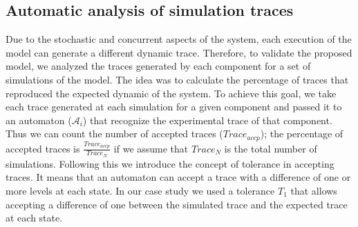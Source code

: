  
 \subsection{Automatic analysis of simulation traces}
 
 Due to the stochastic and concurrent aspects of the system, each execution of the model can generate a different dynamic trace.
 Therefore, to validate the proposed model, we analyzed the traces generated by each component for a set of simulations of the model.
 The idea was to calculate the percentage of traces that reproduced the expected dynamic of the system. 
To achieve this goal, we take each trace generated
 at each simulation for a given component and passed it to an automaton ($\mathcal{A}_{i}$) that recognize the 
experimental trace of that component. Thus we can count the 
 number of accepted traces ($Trace_{accp}$);
the percentage of accepted traces is $\frac{Trace_{accp}}{Trace_{N}}$ if we assume that $Trace_{N}$ is the total 
 number of simulations. 
 Following this we introduce the concept of tolerance in accepting traces. It means that an automaton can accept a trace with a difference 
 of one or more levels at each state. In our case study we used a tolerance $T_{1}$ that allows accepting a difference of one between the 
simulated trace and the expected trace at each state.
 


